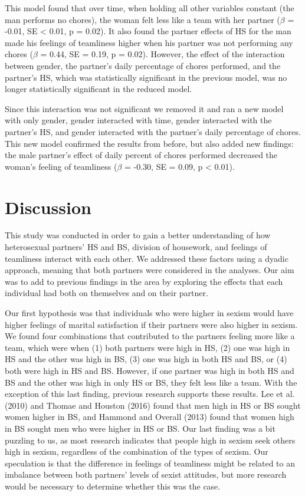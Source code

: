 \documentclass[
  english,
  man]{apa6}
\begin{document}
This model found that over time, when holding all other variables constant (the man performs no chores), the woman felt less like a team with her partner (\(\beta\) = -0.01, SE \textless{} 0.01, p = 0.02). It also found the partner effects of HS for the man made his feelings of teamliness higher when his partner was not performing any chores (\(\beta\) = 0.44, SE = 0.19, p = 0.02). However, the effect of the interaction between gender, the partner's daily percentage of chores performed, and the partner's HS, which was statistically significant in the previous model, was no longer statistically significant in the reduced model.

Since this interaction was not significant we removed it and ran a new model with only gender, gender interacted with time, gender interacted with the partner's HS, and gender interacted with the partner's daily percentage of chores. This new model confirmed the results from before, but also added new findings: the male partner's effect of daily percent of chores performed decreased the woman's feeling of teamliness (\(\beta\) = -0.30, SE = 0.09, p \textless{} 0.01).

\hypertarget{discussion}{%
\section{Discussion}\label{discussion}}

This study was conducted in order to gain a better understanding of how heterosexual partners' HS and BS, division of housework, and feelings of teamliness interact with each other. We addressed these factors using a dyadic approach, meaning that both partners were considered in the analyses. Our aim was to add to previous findings in the area by exploring the effects that each individual had both on themselves and on their partner.

Our first hypothesis was that individuals who were higher in sexism would have higher feelings of marital satisfaction if their partners were also higher in sexism. We found four combinations that contributed to the partners feeling more like a team, which were when (1) both partners were high in HS, (2) one was high in HS and the other was high in BS, (3) one was high in both HS and BS, or (4) both were high in HS and BS. However, if one partner was high in both HS and BS and the other was high in only HS or BS, they felt less like a team. With the exception of this last finding, previous research supports these results. Lee et al. (2010) and Thomae and Houston (2016) found that men high in HS or BS sought women higher in BS, and Hammond and Overall (2013) found that women high in BS sought men who were higher in HS or BS. Our last finding was a bit puzzling to us, as most research indicates that people high in sexism seek others high in sexism, regardless of the combination of the types of sexism. Our speculation is that the difference in feelings of teamliness might be related to an imbalance between both partners' levels of sexist attitudes, but more research would be necessary to determine whether this was the case.
\end{document}
